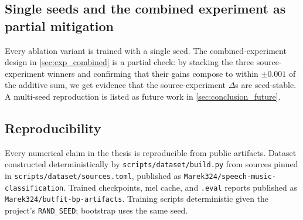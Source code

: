 \subsection*{Single seeds and the combined experiment as partial mitigation}

Every ablation variant is trained with a single seed.
The combined-experiment design in \cref{sec:exp_combined} is a partial check: by stacking the three source-experiment winners and confirming that their gains compose to within $\pm 0.001$ of the additive sum, we get evidence that the source-experiment $\Delta$s are seed-stable.
A multi-seed reproduction is listed as future work in \cref{sec:conclusion_future}.

\subsection*{Reproducibility}

Every numerical claim in the thesis is reproducible from public artifacts.
Dataset constructed deterministically by \texttt{scripts/dataset/build.py} from sources pinned in \texttt{scripts/dataset/sources.toml}, published as \texttt{Marek324/speech-music-classification}.
Trained checkpoints, mel cache, and \texttt{.eval} reports published as \texttt{Marek324/butfit-bp-artifacts}.
Training scripts deterministic given the project's \texttt{RAND\_SEED}; bootstrap uses the same seed.

